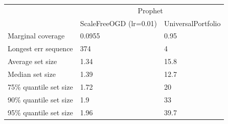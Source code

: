 \begin{tabular}{lll}
\toprule
& \multicolumn{2}{c}{Prophet} \\
& ScaleFreeOGD (lr=0.01) & UniversalPortfolio \\
\midrule
Marginal coverage & 0.0955 & 0.95 \\
Longest err sequence & 374 & 4 \\
Average set size & 1.34 & 15.8 \\
Median set size & 1.39 & 12.7 \\
75\% quantile set size & 1.72 & 20 \\
90\% quantile set size & 1.9 & 33 \\
95\% quantile set size & 1.96 & 39.7 \\
\bottomrule
\end{tabular}
